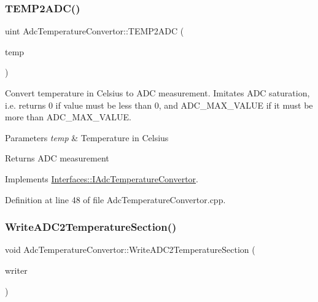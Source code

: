 \mbox{\label{class_adc_temperature_convertor_ae82f374826a431c837bdf796c593775b}} 
\subsubsection{\texorpdfstring{T\+E\+M\+P2\+A\+D\+C()}{TEMP2ADC()}}
{\footnotesize\ttfamily uint Adc\+Temperature\+Convertor\+::\+T\+E\+M\+P2\+A\+DC (\begin{DoxyParamCaption}\item[{double}]{temp }\end{DoxyParamCaption})\hspace{0.3cm}{\ttfamily [virtual]}}



Convert temperature in Celsius to A\+DC measurement. Imitates A\+DC saturation, i.\+e. returns 0 if value must be less than 0, and A\+D\+C\+\_\+\+M\+A\+X\+\_\+\+V\+A\+L\+UE if it must be more than A\+D\+C\+\_\+\+M\+A\+X\+\_\+\+V\+A\+L\+UE. 


\begin{DoxyParams}{Parameters}
{\em temp} & Temperature in Celsius \\
\hline
\end{DoxyParams}
\begin{DoxyReturn}{Returns}
A\+DC measurement 
\end{DoxyReturn}


Implements \hyperlink{class_interfaces_1_1_i_adc_temperature_convertor_ab5d3453ecc41848b723a790fe7e01f79}{Interfaces\+::\+I\+Adc\+Temperature\+Convertor}.



Definition at line 48 of file Adc\+Temperature\+Convertor.\+cpp.

\mbox{\label{class_adc_temperature_convertor_aa06c19d0ac9f45d6f2f67718eda042ac}} 
\subsubsection{\texorpdfstring{Write\+A\+D\+C2\+Temperature\+Section()}{WriteADC2TemperatureSection()}}
{\footnotesize\ttfamily void Adc\+Temperature\+Convertor\+::\+Write\+A\+D\+C2\+Temperature\+Section (\begin{DoxyParamCaption}\item[{Q\+Xml\+Stream\+Writer $\ast$}]{writer }\end{DoxyParamCaption})\hspace{0.3cm}{\ttfamily [virtual]}}



